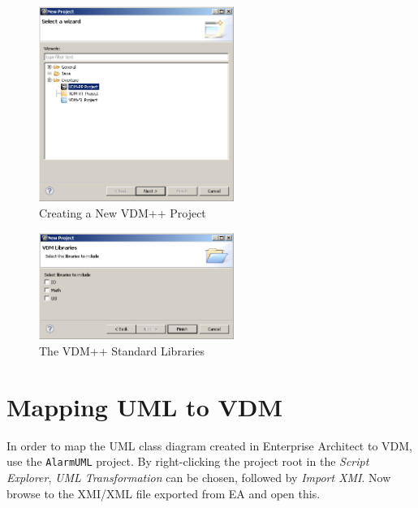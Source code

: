 \begin{figure}[!htb]
\begin{center}
  \includegraphics[width=2.5in]{figures/newoverturePPproject}
  \caption[labelInTOC]{Creating a New VDM++ Project}
  \label{fig:newoverturePPproject}
\end{center}
\end{figure}

\begin{figure}[!htb]
\begin{center}
  \includegraphics[width=2.5in]{figures/stdlibs}
  \caption[labelInTOC]{The VDM++ Standard Libraries}
  \label{fig:stdlibs}
\end{center}
\end{figure}

\section{Mapping UML to  VDM}\label{sec:fromUMLtoVDM}\label{sec:syntaxcheck}
\label{sec:typecheck}

In order to map the UML class diagram created in Enterprise Architect
to VDM, use the \texttt{AlarmUML} project.
By right-clicking the project
root in the \emph{Script Explorer}, \emph{UML Transformation} can be
chosen, followed by \emph{Import XMI}. Now browse to the XMI/XML file
exported from EA and open this.


